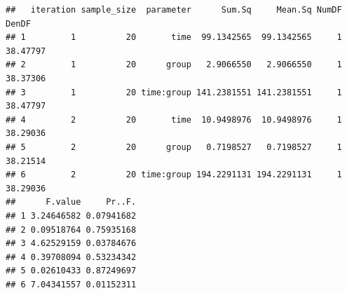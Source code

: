 \documentclass[
]{article}
\begin{document}
\begin{verbatim}
##   iteration sample_size  parameter      Sum.Sq     Mean.Sq NumDF    DenDF
## 1         1          20       time  99.1342565  99.1342565     1 38.47797
## 2         1          20      group   2.9066550   2.9066550     1 38.37306
## 3         1          20 time:group 141.2381551 141.2381551     1 38.47797
## 4         2          20       time  10.9498976  10.9498976     1 38.29036
## 5         2          20      group   0.7198527   0.7198527     1 38.21514
## 6         2          20 time:group 194.2291131 194.2291131     1 38.29036
##      F.value     Pr..F.
## 1 3.24646582 0.07941682
## 2 0.09518764 0.75935168
## 3 4.62529159 0.03784676
## 4 0.39708094 0.53234342
## 5 0.02610433 0.87249697
## 6 7.04341557 0.01152311
\end{verbatim}
\end{document}
